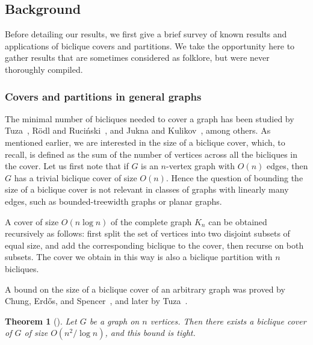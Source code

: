 \documentclass{amsart}
\newtheorem{theorem}{Theorem}%
\begin{document}
\subsection{Background}
\label{subsec:background}

Before detailing our results, we first give a brief survey of known results and applications of biclique covers and partitions. 
We take the opportunity here to gather results that are sometimes 
considered as folklore, but were never thoroughly compiled.

\subsubsection{Covers and partitions in general graphs}

The minimal number of bicliques needed to cover a graph has been studied by 
Tuza~\cite{T84}, R\"{o}dl and Ruci\'{n}ski~\cite{RR97}, and Jukna and Kulikov~\cite{JK09}, among others. 
As mentioned earlier, we are interested in the size of a biclique cover, which, to recall, is defined as the sum of the number of vertices across all the bicliques in the cover.
Let us first note that if $G$ is an $n$-vertex graph with $O(n)$ edges, then $G$ has a trivial biclique cover of size $O(n)$. Hence the question of bounding the size of a biclique cover is not relevant in classes of graphs with linearly many edges, such as bounded-treewidth graphs or planar graphs. 

A cover of size $O(n \log n)$ of the complete graph $K_n$ can be obtained recursively as follows: first split the set of vertices into two disjoint subsets of equal size, and add the corresponding biclique to the cover, then recurse on both subsets. The cover we obtain in this way is also a biclique partition with $n$ bicliques.

A bound on the size of a biclique cover of an arbitrary graph was proved by Chung, Erd\H{o}s, and Spencer~\cite{MR820214}, and later by Tuza~\cite{T84}.
\begin{theorem}[\cite{MR820214, T84}]
\label{thm:gengraphs}
    Let $G$ be a graph on $n$ vertices. Then there exists a biclique cover of $G$ of size $O(n^2/\log n)$, and this bound is tight.
\end{theorem}
\end{document}
